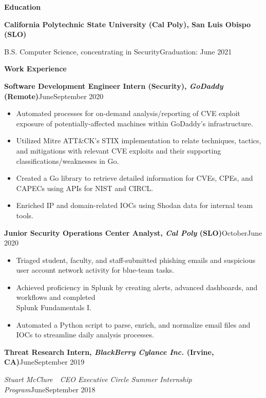 \documentclass[10.5pt]{article}
\newcommand{\resumesection}[2]{
  \vspace{1em}
  \noindent\Large{\textbf{#1}}\hfill\normalsize{#2}
}
\newcommand{\resumelistitem}[1]{
  \item{\normalsize{#1}}
}
\newcommand{\resumejobtitle}[5]{
  \vspace{0.6em}
  \noindent\large{\textbf{#1, \textit{#2} (#3)}}\hfill\normalsize{#4\textemdash#5}
}
\begin{document}
  \pagestyle{resumeheader}

  \resumesection{Education}{~}

    \indent\textbf{California Polytechnic State University (Cal Poly), San Luis Obispo (SLO)}

    \indent\indent\small{B.S. Computer Science, concentrating in Security}\hfill\normalsize{Graduation: June 2021}

  \resumesection{Work Experience}{~}

    \resumejobtitle{Software Development Engineer Intern (Security)}{GoDaddy}{Remote}{June}{September 2020}

    \begin{itemize}
      \setlength{\itemsep}{0.15pt}
      \resumelistitem{Automated processes for on-demand analysis/reporting of CVE exploit exposure of potentially-affected machines within GoDaddy's infrastructure.}
      \resumelistitem{Utilized Mitre ATT\&CK's STIX implementation to relate
        techniques, tactics, and mitigations with relevant CVE
        exploits and their supporting classifications/weaknesses in Go.}
      \resumelistitem{Created a Go library to retrieve detailed information for
        CVEs, CPEs, and CAPECs using APIs for NIST and CIRCL.}
      \resumelistitem{Enriched IP and domain-related IOCs using Shodan data for internal team tools.}
    \end{itemize}

    \resumejobtitle{Junior Security Operations Center Analyst}{Cal Poly}{SLO}{October}{June 2020}

    \begin{itemize}
      \setlength{\itemsep}{0.15pt}
      \resumelistitem{Triaged student, faculty, and staff-submitted phishing emails and suspicious user account network activity for blue-team tasks.}
      \resumelistitem{Achieved proficiency in Splunk by creating alerts, advanced dashboards, and workflows and completed \\ Splunk Fundamentals I.}
      \resumelistitem{Automated a Python script to parse, enrich, and normalize email files and IOCs to streamline daily analysis processes.}
    \end{itemize}

    \resumejobtitle{Threat Research Intern}{BlackBerry Cylance Inc.}{Irvine, CA}{June}{September 2019}

    \noindent\small\textit{Stuart McClure~\textemdash~CEO Executive Circle Summer Internship Program}\hfill\normalsize{June\textemdash September 2018}
\end{document}
